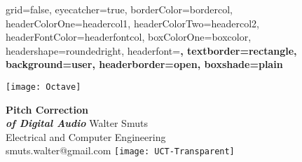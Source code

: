 \documentclass[a1paper,portrait,fontscale=0.4]{baposter}
\begin{document}
\begin{poster}{
	grid=false,
	eyecatcher=true,
	borderColor=bordercol,
	headerColorOne=headercol1,
	headerColorTwo=headercol2,
	headerFontColor=headerfontcol,
	boxColorOne=boxcolor,
	headershape=roundedright,
	headerfont=\Large\sf\bf,
	textborder=rectangle,
	background=user,
	headerborder=open,
  boxshade=plain
}
{
	\begin{minipage}[t][3cm][t]{3cm}\centering
	\vfill
	\texttt{[image: Octave]}
	\vfill
	\vfill
	\end{minipage}
}
{\sf\bf
	Pitch Correction \\ \large\it of Digital Audio
}
{
	{\smaller\smaller 
	\vspace{1em} Walter Smuts\\
	Electrical and Computer Engineering\\
	smuts.walter@gmail.com}
}
{
	\texttt{[image: UCT-Transparent]}
}








\end{poster}
\end{document}
